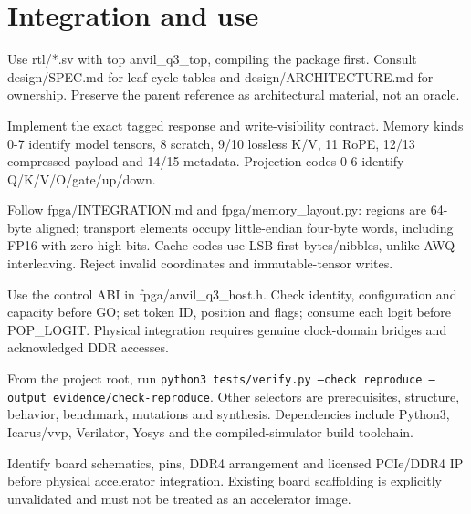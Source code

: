\documentclass[11pt,a4paper]{article}
\begin{document}
\section{Integration and use}

Use rtl/\allowbreak{}*\allowbreak{}.sv with top anvil\_\allowbreak{}q3\_\allowbreak{}top,\allowbreak{} compiling the package first. Consult design/\allowbreak{}SPEC.md for leaf cycle tables and design/\allowbreak{}ARCHITECTURE.md for ownership. Preserve the parent reference as architectural material,\allowbreak{} not an oracle.


Implement the exact tagged response and write-visibility contract. Memory kinds 0-7 identify model tensors,\allowbreak{} 8 scratch,\allowbreak{} 9/\allowbreak{}10 lossless K/\allowbreak{}V,\allowbreak{} 11 RoPE,\allowbreak{} 12/\allowbreak{}13 compressed payload and 14/\allowbreak{}15 metadata. Projection codes 0-6 identify Q/\allowbreak{}K/\allowbreak{}V/\allowbreak{}O/\allowbreak{}gate/\allowbreak{}up/\allowbreak{}down.


Follow fpga/\allowbreak{}INTEGRATION.md and fpga/\allowbreak{}memory\_\allowbreak{}layout.py: regions are 64-byte aligned; transport elements occupy little-endian four-byte words,\allowbreak{} including FP16 with zero high bits. Cache codes use LSB-first bytes/\allowbreak{}nibbles,\allowbreak{} unlike AWQ interleaving. Reject invalid coordinates and immutable-tensor writes.


Use the control ABI in fpga/\allowbreak{}anvil\_\allowbreak{}q3\_\allowbreak{}host.h. Check identity,\allowbreak{} configuration and capacity before GO; set token ID,\allowbreak{} position and flags; consume each logit before POP\_\allowbreak{}LOGIT. Physical integration requires genuine clock-domain bridges and acknowledged DDR accesses.


From the project root,\allowbreak{} run \texttt{python3 tests/\allowbreak{}verify.py --check reproduce --output evidence/\allowbreak{}check-reproduce}. Other selectors are prerequisites,\allowbreak{} structure,\allowbreak{} behavior,\allowbreak{} benchmark,\allowbreak{} mutations and synthesis. Dependencies include Python3,\allowbreak{} Icarus/\allowbreak{}vvp,\allowbreak{} Verilator,\allowbreak{} Yosys and the compiled-simulator build toolchain.


Identify board schematics,\allowbreak{} pins,\allowbreak{} DDR4 arrangement and licensed PCIe/\allowbreak{}DDR4 IP before physical accelerator integration. Existing board scaffolding is explicitly unvalidated and must not be treated as an accelerator image.
\end{document}
